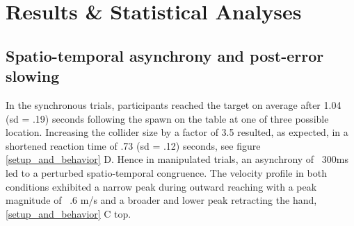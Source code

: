 \section{Results \& Statistical Analyses}



\subsection{Spatio-temporal asynchrony and post-error slowing}

In the synchronous trials, participants reached the target on average after 1.04 (sd = .19) seconds following the spawn on the table at one of three possible location. Increasing the collider size by a factor of 3.5 resulted, as expected, in a shortened reaction time of .73 (sd = .12) seconds, see figure \ref{setup_and_behavior} D. Hence in manipulated trials, an asynchrony of ~300ms led to a perturbed spatio-temporal congruence. The velocity profile in both conditions exhibited a narrow peak during outward reaching with a peak magnitude of ~.6 m/s and a broader and lower peak retracting the hand, \ref{setup_and_behavior} C top.


